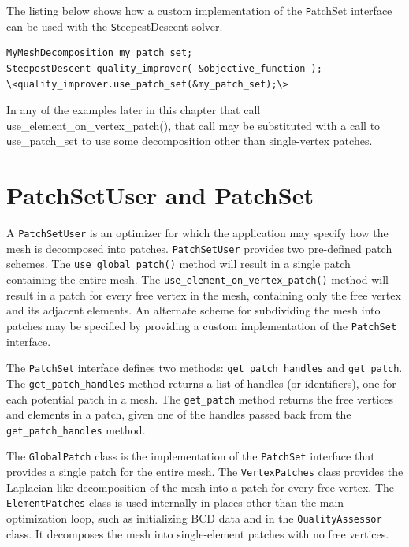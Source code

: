 The listing below shows how a custom implementation of the {\texttt PatchSet} interface can be used with the {\texttt SteepestDescent} solver.

\begin{lstlisting}[frame=single]
MyMeshDecomposition my_patch_set;
SteepestDescent quality_improver( &objective_function );
\<quality_improver.use_patch_set(&my_patch_set);\>
\end{lstlisting}

In any of the examples later in this chapter that call {\texttt use\_element\_on\_vertex\_patch()}, that call may be substituted with a call to {\texttt use\_patch\_set} to use some decomposition other than single-vertex patches.


\section{PatchSetUser and PatchSet}

A \texttt{PatchSetUser} is an optimizer for which the application may specify how the mesh is decomposed into patches.  \texttt{PatchSetUser} provides two pre-defined patch schemes.  The \texttt{use\_global\_patch()} method will result in a single patch containing the entire mesh.  The \texttt{use\_element\_on\_vertex\_patch()} method will result in a patch for every free vertex in the mesh, containing only the free vertex and its adjacent elements.  An alternate scheme for subdividing the mesh into patches may be specified by providing a custom implementation of the \texttt{PatchSet} interface.

The \texttt{PatchSet} interface defines two methods: \texttt{get\_patch\_handles} and \texttt{get\_patch}.  The \texttt{get\_patch\_handles} method returns a list of handles (or identifiers), one for each potential patch in a mesh.  The \texttt{get\_patch} method returns the free vertices and elements in a patch, given one of the handles passed back from the \texttt{get\_patch\_handles} method.

The \texttt{GlobalPatch} class is the implementation of the \texttt{PatchSet} interface that provides a single patch for the entire mesh.  The \texttt{VertexPatches} class provides the Laplacian-like decomposition of the mesh into a patch for every free vertex.  The \texttt{ElementPatches} class is used internally in places other than the main optimization loop, such as initializing BCD data and in the \texttt{QualityAssessor} class.  It decomposes the mesh into single-element patches with no free vertices.


